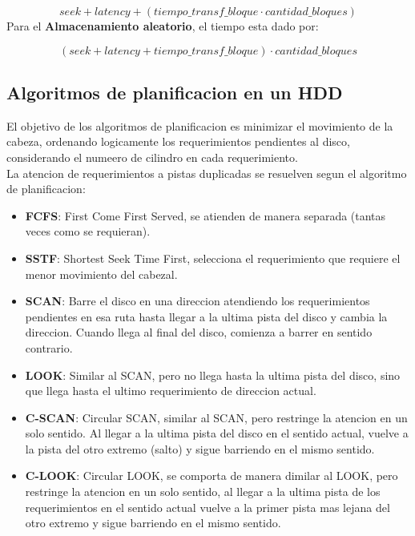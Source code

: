\documentclass[12pt]{article}
\begin{document}
\begin{equation}
    seek + latency + (tiempo\_transf\_bloque \cdot cantidad\_bloques)
    \label{eq:2}
\end{equation}
Para el \textbf{Almacenamiento aleatorio}, el tiempo esta dado por:

\begin{equation}
    (seek + latency + tiempo\_transf\_bloque)  \cdot cantidad\_bloques
    \label{eq:3}
\end{equation}


\subsection{Algoritmos de planificacion en un HDD}
El objetivo de los algoritmos de planificacion es minimizar el movimiento de la cabeza, ordenando logicamente los requerimientos pendientes al disco, considerando el numeero de cilindro en cada requerimiento.\\
La atencion de requerimientos a pistas duplicadas se resuelven segun el algoritmo de planificacion:
\begin{itemize}
    \item \textbf{FCFS}: First Come First Served, se atienden de manera separada (tantas veces como se requieran).
    \item \textbf{SSTF}: Shortest Seek Time First, selecciona el requerimiento que requiere el menor movimiento del cabezal.
    \item \textbf{SCAN}: Barre el disco en una direccion atendiendo los requerimientos pendientes en esa ruta hasta llegar a la ultima pista del disco y cambia la direccion. Cuando llega al final del disco, comienza a barrer en sentido contrario.
    \item \textbf{LOOK}: Similar al SCAN, pero no llega hasta la ultima pista del disco, sino que llega hasta el ultimo requerimiento de direccion actual.
    \item \textbf{C-SCAN}: Circular SCAN, similar al SCAN, pero restringe la atencion en un solo sentido. Al llegar a la ultima pista del disco en el sentido actual, vuelve a la pista del otro extremo (salto) y sigue barriendo en el mismo sentido.
    \item \textbf{C-LOOK}: Circular LOOK, se comporta de manera dimilar al LOOK, pero restringe la atencion en un solo sentido, al llegar a la ultima pista de los requerimientos en el sentido actual vuelve a la primer pista mas lejana del otro extremo y sigue barriendo en el mismo sentido.
\end{itemize}
\end{document}
